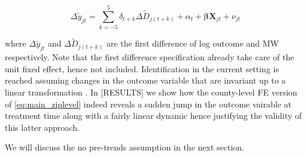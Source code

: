 \begin{equation}\label{eq:diff_main}
    \Delta \tilde{y}_{jt} = \sum\limits_{k = -5}^{5} \delta_{t+k} \Delta \tilde{D}_{j(t+k)} + \alpha_{t} + \boldsymbol{\beta} \boldsymbol{X}_{jt} + \nu_{jt}
\end{equation}

where $\Delta \tilde{y}_{jt}$ and $\Delta \tilde{D}_{j(t+k)}$ are the first difference of log outcome and MW respectively. Note that the first difference specification already take care of the unit fixed effect, hence not included. Identification in the current setting is reached assuming changes in the outcome variable that are invariant up to a linear transformation \parencite{borusyak2017revisiting}. In [RESULTS] we show how the county-level FE version of \autoref{eq:main_ziplevel} indeed reveals a sudden jump in the outcome vairable at treatment time along with a fairly linear dynamic hence justifying the validity of this latter approach. 

We will discuss the no pre-trends assumption in the next section.
